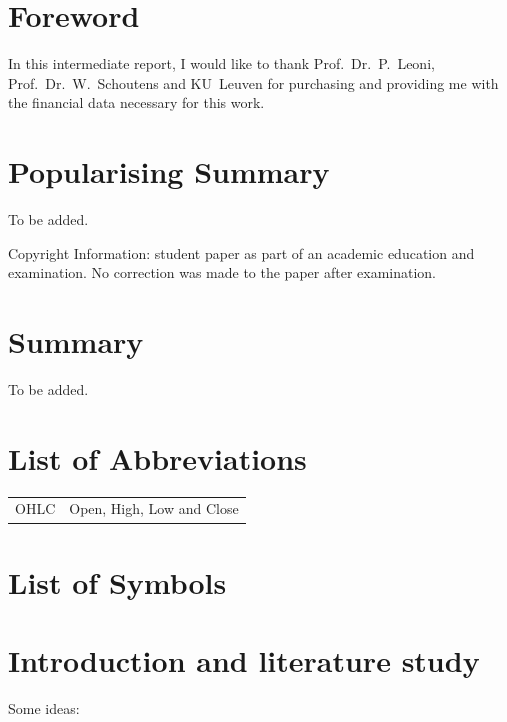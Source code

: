 \documentclass[
  12pt,
  a4paper,
  oneside]{book}
\begin{document}
\newpage\phantom{}

\chapter*{Foreword}\label{foreword}


In this intermediate report, I would like to thank Prof.~Dr.~P.~Leoni, Prof.~Dr.~W.~Schoutens and KU~Leuven for purchasing and providing me with the financial data necessary for this work.

\vfill

\chapter{Popularising Summary}\label{popularising-summary}

To be added.

\vfill

Copyright Information: student paper as part of an academic education and examination. No correction was made to the paper after examination.

\chapter{Summary}\label{summary}

To be added.

\chapter{List of Abbreviations}\label{list-of-abbreviations}

\begin{tabular}{l l}
OHLC & Open, High, Low and Close
\end{tabular}

\chapter{List of Symbols}\label{list-of-symbols}

\tableofcontents
\mainmatter

\chapter{Introduction and literature study}\label{introduction-and-literature-study}

Some ideas:
\end{document}
